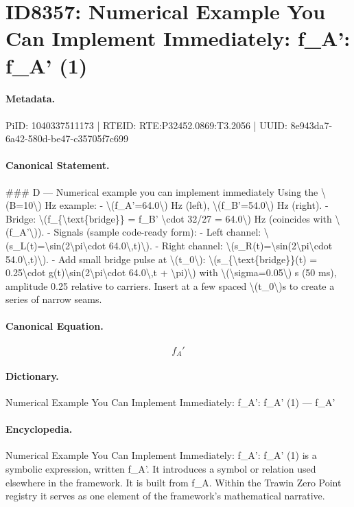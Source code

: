 \section*{ID8357: Numerical Example You Can Implement Immediately: f\_A': f\_A' (1)}
\paragraph{Metadata.}
PiID: 1040337511173 | RTEID: RTE:P32452.0869:T3.2056 | UUID: 8e943da7-6a42-580d-be47-c35705f7c699

\paragraph{Canonical Statement.}
\#\#\# D — Numerical example you can implement immediately Using the \textbackslash{}(B=10\textbackslash{}) Hz example: - \textbackslash{}(f\_A'=64.0\textbackslash{}) Hz (left), \textbackslash{}(f\_B'=54.0\textbackslash{}) Hz (right). - Bridge: \textbackslash{}(f\_\{\textbackslash{}text\{bridge\}\} = f\_B' \textbackslash{}cdot 32/27 = 64.0\textbackslash{}) Hz (coincides with \textbackslash{}(f\_A'\textbackslash{})). - Signals (sample code-ready form): - Left channel: \textbackslash{}(s\_L(t)=\textbackslash{}sin(2\textbackslash{}pi\textbackslash{}cdot 64.0\textbackslash{},t)\textbackslash{}). - Right channel: \textbackslash{}(s\_R(t)=\textbackslash{}sin(2\textbackslash{}pi\textbackslash{}cdot 54.0\textbackslash{},t)\textbackslash{}). - Add small bridge pulse at \textbackslash{}(t\_0\textbackslash{}): \textbackslash{}(s\_\{\textbackslash{}text\{bridge\}\}(t) = 0.25\textbackslash{}cdot g(t)\textbackslash{}sin(2\textbackslash{}pi\textbackslash{}cdot 64.0\textbackslash{},t + \textbackslash{}pi)\textbackslash{}) with \textbackslash{}(\textbackslash{}sigma=0.05\textbackslash{}) s (50 ms), amplitude 0.25 relative to carriers. Insert at a few spaced \textbackslash{}(t\_0\textbackslash{})s to create a series of narrow seams.

\paragraph{Canonical Equation.}
\[
f_A'
\]

\paragraph{Dictionary.}
Numerical Example You Can Implement Immediately: f\_A': f\_A' (1) — f\_A'

\paragraph{Encyclopedia.}
Numerical Example You Can Implement Immediately: f\_A': f\_A' (1) is a symbolic expression, written f\_A'. It introduces a symbol or relation used elsewhere in the framework. It is built from f\_A. Within the Trawin Zero Point registry it serves as one element of the framework's mathematical narrative.
